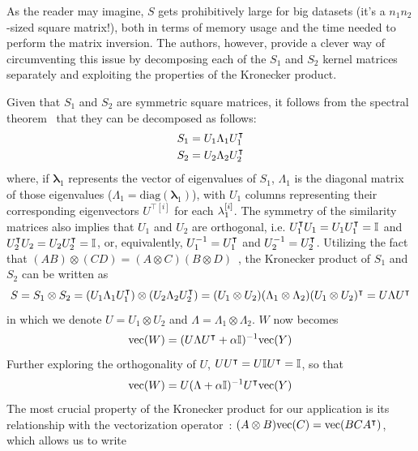 As the reader may imagine, $S$ gets prohibitively large for big datasets (it's a $n_1 n_2$-sized square matrix!), both in terms of memory usage and the time needed to perform the matrix inversion. The authors, however, provide a clever way of circumventing this issue by decomposing each of the $S_1$ and $S_2$ kernel matrices separately and exploiting the properties of the Kronecker product.

Given that $S_1$ and $S_2$ are symmetric square matrices, it follows from the spectral theorem~\cite{} that they can be decomposed as follows:
%
\begin{gather*}
    S_1 = U_1 \Lambda_1 U_1^\intercal \\
    S_2 = U_2 \Lambda_2 U_2^\intercal
\end{gather*}
%
where, if $\mathbf{\lambda}_1$ represents the vector of eigenvalues of $S_1$, $\Lambda_1$ is the diagonal matrix of those eigenvalues ($\Lambda_1 = \text{diag}(\mathbf{\lambda}_1)$), with $U_1$ columns representing their corresponding eigenvectors $U^{\intercal[i]}$ for each $\mathbf{\lambda}_1^{[i]}$. The symmetry of the similarity matrices also implies that $U_1$ and $U_2$ are orthogonal, i.e. $U_1^\intercal U_1 = U_1 U_1^\intercal = \mathbb{I}$ and $U_2^\intercal U_2 = U_2 U_2^\intercal = \mathbb{I}$, or, equivalently, $U_1^{-1} = U_1^\intercal$ and $U_2^{-1} = U_2^\intercal$.
%
Utilizing the fact that $(AB) \otimes (CD) = (A \otimes C)(B \otimes D)$~\cite{}, the Kronecker product of $S_1$ and $S_2$ can be written as
%
\begin{equation}
    S = S_1 \otimes S_2
    = (U_1 \Lambda_1 U_1^\intercal) \otimes (U_2 \Lambda_2 U_2^\intercal)
    = (U_1 \otimes U_2) (\Lambda_1 \otimes \Lambda_2) (U_1 \otimes U_2)^\intercal
    = U \Lambda U^\intercal
\end{equation}
%
in which we denote $U = U_1 \otimes U_2$ and $\Lambda = \Lambda_1 \otimes \Lambda_2$.
$W$ now becomes
%
\begin{equation*}
    \text{vec}(W) = (U \Lambda U^\intercal + \alpha \mathbb{I})^{-1} \text{vec}(Y)
\end{equation*}
%
Further exploring the orthogonality of $U$, $U U^\intercal = U \mathbb{I} U^\intercal = \mathbb{I}$, so that
%
\begin{equation*}
    \text{vec}(W) = U (\Lambda + \alpha\mathbb{I})^{-1} U^\intercal \text{vec}(Y)
\end{equation*}
%
The most crucial property of the Kronecker product for our application is its relationship with the vectorization operator~\cite{}: $(A \otimes B)\text{vec} (C) = \text{vec}(BCA^\intercal)$, which allows us to write
